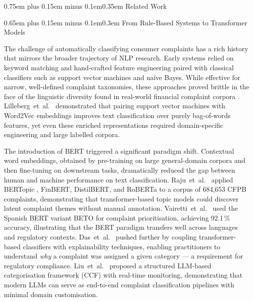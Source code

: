 \documentclass[10pt,a4paper,twocolumn]{article}
\makeatletter
\renewcommand\section{\@startsection{section}{1}{0pt}%
  {0.75em plus 0.15em minus 0.1em}{0.35em}%
  {\normalfont\normalsize\itshape}}
\renewcommand\subsection{\@startsection{subsection}{2}{0pt}%
  {0.65em plus 0.15em minus 0.1em}{0.3em}%
  {\normalfont\normalsize\itshape}}
\makeatother
\begin{document}
\section{Related Work}
\label{sec:related}

\subsection{From Rule-Based Systems to Transformer Models}

The challenge of automatically classifying consumer complaints has a
rich history that mirrors the broader trajectory of NLP research. Early
systems relied on keyword matching and hand-crafted feature engineering
paired with classical classifiers such as support vector machines and
na{\"i}ve Bayes. While effective for narrow, well-defined complaint
taxonomies, these approaches proved brittle in the face of the
linguistic diversity found in real-world financial complaint corpora
\cite{raju2022bertopic,jondhale2024cfpb}.
Lilleberg~et~al.\ \cite{lilleberg2015word2vec} demonstrated that pairing
support vector machines with Word2Vec embeddings improves text classification
over purely bag-of-words features, yet even these enriched representations
required domain-specific engineering and large labelled corpora.

The introduction of BERT \cite{devlin2019bert} triggered a significant
paradigm shift. Contextual word embeddings, obtained by pre-training on
large general-domain corpora and then fine-tuning on downstream tasks,
dramatically reduced the gap between human and machine performance on
text classification. Raju~et~al.\ \cite{raju2022bertopic} applied
BERTopic \cite{grootendorst2020bertopic}, FinBERT, DistilBERT, and
RoBERTa to a corpus of 684,653 CFPB complaints, demonstrating that
transformer-based topic models could discover latent complaint themes
without manual annotation. Vairetti~et~al.\ \cite{vairetti2024bert}
used the Spanish BERT variant BETO for complaint prioritisation,
achieving 92.1\,\% accuracy, illustrating that the BERT paradigm
transfers well across languages and regulatory contexts. Das~et~al.\
\cite{das2024explainable} pushed further by coupling transformer-based
classifiers with explainability techniques, enabling practitioners to
understand \emph{why} a complaint was assigned a given category --- a
requirement for regulatory compliance. Liu~et~al.\ \cite{liu2024framework}
proposed a structured LLM-based categorisation framework (CCF) with
real-time monitoring, demonstrating that modern LLMs can serve as
end-to-end complaint classification pipelines with minimal domain
customisation.
\end{document}
